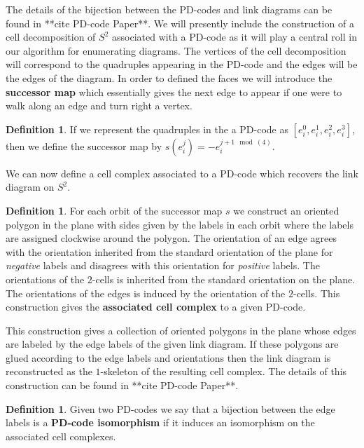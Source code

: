\documentclass[amsmath,secnumarabic,floatfix,amssymb,nofootinbib,nobibnotes,letterpaper,11pt,tightenlines,showkeys]{revtex4}
\theoremstyle{definition}
\newtheorem{definition}[theorem]{Definition}
\let\mgp=\marginpar \marginparwidth18mm \marginparsep1mm
\def\marginpar#1{\mgp{\raggedright\tiny #1}}
\let\lbl=\label
\def\label#1{\lbl{#1}\ifinner\else\marginpar{\ref{#1} #1}\ignorespaces\fi}
\begin{document}
The details of the bijection between the PD-codes and link diagrams can be found in **cite PD-code Paper**. We will presently include the construction of a cell decomposition of $S^2$ associated with a PD-code as it will play a central roll in our algorithm for enumerating diagrams. The vertices of the cell decomposition will correspond to the quadruples appearing in the PD-code and the edges will be the edges of the diagram. In order to defined the faces we will introduce the \textbf{successor map} which essentially gives the next edge to appear if one were to walk along an edge and turn right a vertex.

\begin{definition}
 If we represent the quadruples in the a PD-code as $[e_i^0,e_i^1,e_i^2,e_i^3]$, then we define the successor map by $s(e_i^j)=-e_i^{j+1 \mod(4)}$.
\end{definition}

We can now define a cell complex associated to a PD-code which recovers the link diagram on $S^2$.

\begin{definition}\label{def:surface}
For each orbit of the successor map $s$ we construct an oriented polygon in the plane with sides given by the labels in each orbit where the labels are assigned clockwise around the polygon. The orientation of an edge agrees with the orientation inherited from the standard orientation of the plane for \emph{negative} labels and disagrees with this orientation for \emph{positive} labels. The orientations of the $2$-cells is inherited from the standard orientation on the plane. The orientations of the edges is induced by the orientation of the $2$-cells. This construction gives the \textbf{associated cell complex} to a given PD-code.
\end{definition}

This construction gives a collection of oriented polygons in the plane whose edges are labeled by the edge labels of the given link diagram. If these polygons are glued according to the edge labels and orientations then the link diagram is reconstructed as the $1$-skeleton of the resulting cell complex. The details of this construction can be found in **cite PD-code Paper**.

\begin{definition}\label{def:PDIsom}
	Given two PD-codes we say that a bijection between the edge labels is a \textbf{PD-code isomorphism} if it induces an isomorphism on the associated cell complexes.
\end{definition}
\end{document}
